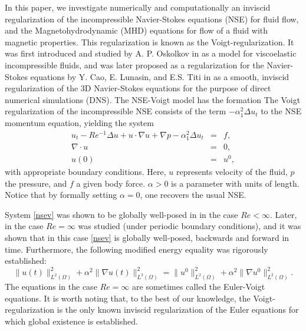 \documentclass[11pt]{article}%
\numberwithin{equation}{section}
\begin{document}
In this paper, we investigate numerically and computationally an inviscid regularization of the incompressible Navier-Stokes equations (NSE) for fluid flow, and the Magnetohydrodynamic (MHD) equations for flow of a fluid with magnetic properties.  This regularization is known as the Voigt-regularization.  It was first introduced and studied by A. P. Oskolkov in \cite{Oskolkov_1973} as a model for viscoelastic incompressible fluids, and was later proposed as a regularization for the Navier-Stokes equations by Y. Cao, E. Lunasin, and E.S. Titi in \cite{Cao_Lunasin_Titi_2006} as a smooth, inviscid regularization of the 3D Navier-Stokes equations for the purpose of direct numerical simulations (DNS).  The NSE-Voigt model has the formation
The Voigt regularization of the incompressible NSE consists of the term 
$- \alpha_1^2 \Delta u_t$ to the NSE momentum equation, yielding the system
\begin{subequations}\label{nsev}
\begin{eqnarray}
u_t - Re^{-1}\Delta u  + u\cdot\nabla u  + \nabla p - \alpha_1^2 \Delta u_t & = & f, \label{nsev1} \\
\nabla \cdot u & = & 0, \label{nsev2} \\
u(0) & = & u^0, \label{nsev_init} 
\end{eqnarray}
\end{subequations}
with appropriate boundary conditions.  Here, $u$ represents velocity of the fluid, $p$ the pressure, and $f$ a given body force.  $\alpha>0$ is a parameter with units of length.  Notice that by formally setting $\alpha=0$, one recovers the usual NSE.  

System \eqref{nsev} was shown to be globally well-posed in \cite{Oskolkov_1973} in the case $Re < \infty$.  Later, in \cite{Cao_Lunasin_Titi_2006} the case $Re = \infty$ was studied (under periodic boundary conditions), and it was shown that in this case \eqref{nsev} is globally well-posed, backwards and forward in time.   Furthermore, the following modified energy equality was rigorously established:
\begin{equation}\label{modified_energy_equality}
\|u(t)\|_{L^2({\Omega})}^2+\alpha^2\|\nabla u(t)\|_{L^2({\Omega})}^2=\|u^0\|_{L^2({\Omega})}^2+\alpha^2\|\nabla u^0\|_{L^2({\Omega})}^2.
\end{equation}
The equations in the case $Re = \infty$ are sometimes called the Euler-Voigt equations.  It is worth noting that, to the best of our knowledge, the Voigt-regularization is the only known inviscid regularization of the Euler equations for which global existence is established.
\end{document}
